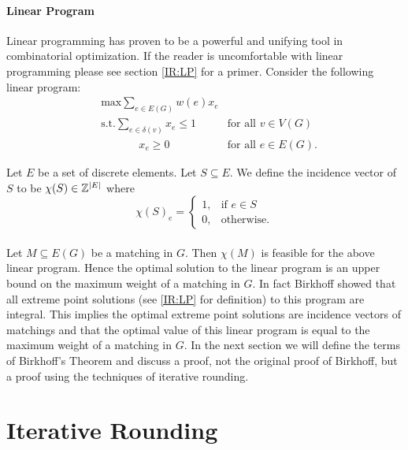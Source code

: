 \paragraph{Linear Program}
Linear programming has proven to be a powerful and unifying tool in combinatorial optimization. If the reader is uncomfortable with linear programming please see section \ref{IR:LP} for a primer. Consider the following linear program:
\begin{align*}
	&\text{max} \sum_{e \in E(G)} w(e) x_e \\
	&\text{s.t.} \sum_{e \in \delta(v)} x_e \leq 1 &\text{for all $v \in V(G)$} \\
	&\quad\quad\quad\ \ x_e \geq 0 &\text{for all $e \in E(G)$.}
\end{align*}
\begin{definition}
Let $E$ be a set of discrete elements. Let $S \subseteq E$. We define the incidence vector of $S$ to be $\chi(S) \in \mathbb{Z}^{|E|}$ where 
$$ \chi(S)_e = \begin{cases}
1, &\text{if $e \in S$ } \\
0, &\text{otherwise.}
\end{cases}$$
\end{definition}
\paragraph{}
Let $M\subseteq E(G)$ be a matching in $G$. Then $\chi(M)$ is feasible for the above linear program. Hence the optimal solution to the linear program is an upper bound on the maximum weight of a matching in $G$. In fact Birkhoff \cite{birkhoff1946tres} showed that all extreme point solutions (see \ref{IR:LP} for definition) to this program are integral. This implies the optimal extreme point solutions are incidence vectors of matchings and that the optimal value of this linear program is equal to the maximum weight of a matching in $G$. In the next section we will define the terms of Birkhoff's Theorem and discuss a proof, not the original proof of Birkhoff, but a proof using the techniques of iterative rounding.
\section{Iterative Rounding}\label{IR}
